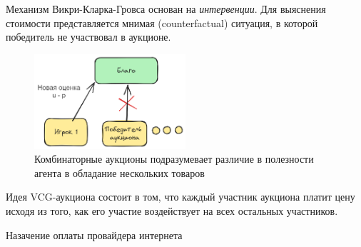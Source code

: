 Механизм Викри-Кларка-Гровса основан на \textit{интервенции}. Для выяснения стоимости представляется мнимая (counterfactual) ситуация, в которой победитель не участвовал в аукционе.

\begin{figure}[h]
    \centering
    \includegraphics[width=0.5\textwidth]{assets/mechanism/vcg.excalidraw.png}
    \caption{Комбинаторные аукционы подразумевает различие в полезности агента в обладание нескольких товаров}
    \label{сombinatorial}
\end{figure}





 Идея VCG-аукциона состоит в том, что каждый участник аукциона платит цену исходя из того, как его участие воздействует на всех остальных участников. 


 Назачение оплаты провайдера интернета